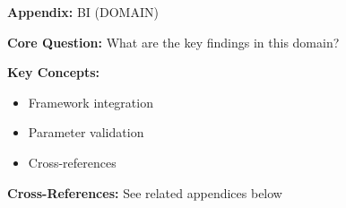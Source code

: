 \begin{tcolorbox}[colback=blue!5!white, colframe=blue!75!black,
    title=Quick Reference: Appendix BI]

\textbf{Appendix:} BI (DOMAIN)

\textbf{Core Question:} What are the key findings in this domain?

\textbf{Key Concepts:}
\begin{itemize}[nosep]
\item Framework integration
\item Parameter validation
\item Cross-references
\end{itemize}

\textbf{Cross-References:} See related appendices below
\end{tcolorbox}


\begin{abstract}
This appendix extends the EBF life journey framework (Chapter 24) to the intergenerational
domain. While RRR, OOO, and PPP provide individual-level templates, dynamics, and simulations,
this appendix addresses how behavioral pathways propagate across generations: how parents'
Health, Money, Career, Relationships, Self-Governance, Living Space, and Meaning journeys
affect children's journey initialization states ($\phi_0$, segment distribution, parameter values).
The contribution is threefold: (1) a formal intergenerational spillover matrix $\Gamma^{inter}$,
(2) multi-generational case studies spanning 60+ years, and (3) policy implications for
family-level versus individual-level interventions.
\end{abstract}



